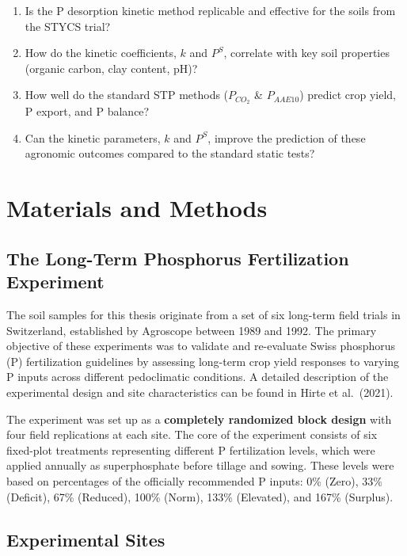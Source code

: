 \documentclass[
  a4paper,
]{article}
\providecommand{\tightlist}{%
  \setlength{\itemsep}{0pt}\setlength{\parskip}{0pt}}\usepackage{longtable,booktabs,array}
\begin{document}
\begin{enumerate}
\def\labelenumi{\arabic{enumi}.}
\tightlist
\item
  Is the P desorption kinetic method replicable and effective for the
  soils from the STYCS trial?
\item
  How do the kinetic coefficients, \(k\) and \(P^S\), correlate with key
  soil properties (organic carbon, clay content, pH)?
\item
  How well do the standard STP methods (\(P_{CO_2}\) \& \(P_{AAE10}\))
  predict crop yield, P export, and P balance?
\item
  Can the kinetic parameters, \(k\) and \(P^S\), improve the prediction
  of these agronomic outcomes compared to the standard static tests?
\end{enumerate}

\section{Materials and Methods}\label{materials-and-methods}

\subsection{The Long-Term Phosphorus Fertilization
Experiment}\label{the-long-term-phosphorus-fertilization-experiment}

The soil samples for this thesis originate from a set of six long-term
field trials in Switzerland, established by Agroscope between 1989 and
1992. The primary objective of these experiments was to validate and
re-evaluate Swiss phosphorus (P) fertilization guidelines by assessing
long-term crop yield responses to varying P inputs across different
pedoclimatic conditions. A detailed description of the experimental
design and site characteristics can be found in Hirte et al.~(2021).

The experiment was set up as a \textbf{completely randomized block
design} with four field replications at each site. The core of the
experiment consists of six fixed-plot treatments representing different
P fertilization levels, which were applied annually as superphosphate
before tillage and sowing. These levels were based on percentages of the
officially recommended P inputs: 0\% (Zero), 33\% (Deficit), 67\%
(Reduced), 100\% (Norm), 133\% (Elevated), and 167\% (Surplus).

\subsection{Experimental Sites}\label{experimental-sites}
\end{document}
